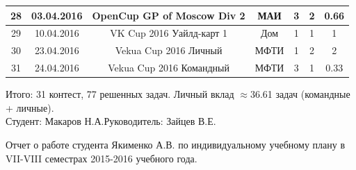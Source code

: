 \documentclass[a4paper,12pt]{article}
\begin{document}
\begin{table}[ht!]
\begin{tabular}{|c|c|c|c|c|c|c|}
28 & 03.04.2016 & OpenCup GP of Moscow Div 2   & МАИ & 3 & 2 & 0.66   \\ \hline

29 & 10.04.2016 & VK Cup 2016 Уайлд-карт 1     & Дом & 1 & 1 & 1 	  \\ \hline

30 & 23.04.2016 & Vekua Cup 2016 Личный  & МФТИ & 1 & 2 & 2	  \\ \hline

31 & 24.04.2016 & Vekua Cup 2016 Командный & МФТИ & 3 & 1 & 0.33 \\ \hline

\end{tabular}
\end{table}


Итого: 31 контест, 77 решенных задач. Личный вклад $\approx$36.61 задач (командные + личные). \\

\noindent Студент:\underline{\hspace{3cm}} Макаров Н.А.\hfill Руководитель:\underline{\hspace{3cm}} Зайцев В.Е.

\newpage


Отчет о работе студента Якименко А.В. по индивидуальному учебному плану в VII-VIII семестрах 2015-2016 учебного года.
\end{document}
